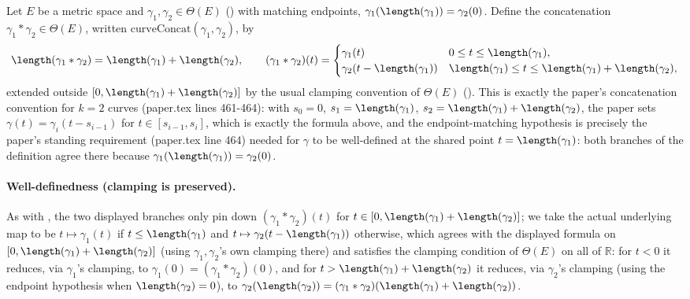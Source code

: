 \begin{definition}
  Let $E$ be a metric space and $\gamma_1, \gamma_2 \in \Theta(E)$ () with matching
  endpoints, $\gamma_1(\length(\gamma_1)) = \gamma_2(0)$. Define the concatenation
  $\gamma_1 * \gamma_2 \in \Theta(E)$, written $\mathrm{curveConcat}(\gamma_1,\gamma_2)$, by
  \[
    \length(\gamma_1 * \gamma_2) = \length(\gamma_1) + \length(\gamma_2)
    , \qquad
    (\gamma_1 * \gamma_2)(t) =
    \begin{cases}
      \gamma_1(t) & 0 \le t \le \length(\gamma_1) , \\
      \gamma_2(t - \length(\gamma_1)) & \length(\gamma_1) \le t \le \length(\gamma_1)+\length(\gamma_2) ,
    \end{cases}
  \]
  extended outside $[0,\length(\gamma_1)+\length(\gamma_2)]$ by the usual clamping convention of
  $\Theta(E)$ (). This is exactly the paper's concatenation convention for $k=2$
  curves (paper.tex lines 461-464): with $s_0=0$, $s_1=\length(\gamma_1)$,
  $s_2=\length(\gamma_1)+\length(\gamma_2)$, the paper sets $\gamma(t) = \gamma_i(t-s_{i-1})$ for
  $t \in [s_{i-1},s_i]$, which is exactly the formula above, and the endpoint-matching hypothesis
  is precisely the paper's standing requirement (paper.tex line 464) needed for $\gamma$ to be
  well-defined at the shared point $t=\length(\gamma_1)$: both branches of the definition agree
  there because $\gamma_1(\length(\gamma_1)) = \gamma_2(0)$.

  \paragraph{Well-definedness (clamping is preserved).} As with , the two
  displayed branches only pin down $(\gamma_1 * \gamma_2)(t)$ for
  $t \in [0,\length(\gamma_1)+\length(\gamma_2)]$; we take the actual underlying map to be
  $t \mapsto \gamma_1(t)$ if $t \le \length(\gamma_1)$ and $t \mapsto \gamma_2(t-\length(\gamma_1))$
  otherwise, which agrees with the displayed formula on
  $[0,\length(\gamma_1)+\length(\gamma_2)]$ (using $\gamma_1,\gamma_2$'s own clamping there) and
  satisfies the clamping condition of $\Theta(E)$ on all of $\mathbb{R}$: for $t < 0$ it reduces,
  via $\gamma_1$'s clamping, to $\gamma_1(0) = (\gamma_1*\gamma_2)(0)$, and for
  $t > \length(\gamma_1)+\length(\gamma_2)$ it reduces, via $\gamma_2$'s clamping (using the
  endpoint hypothesis when $\length(\gamma_2)=0$), to $\gamma_2(\length(\gamma_2)) =
  (\gamma_1*\gamma_2)(\length(\gamma_1)+\length(\gamma_2))$.


\end{definition}
